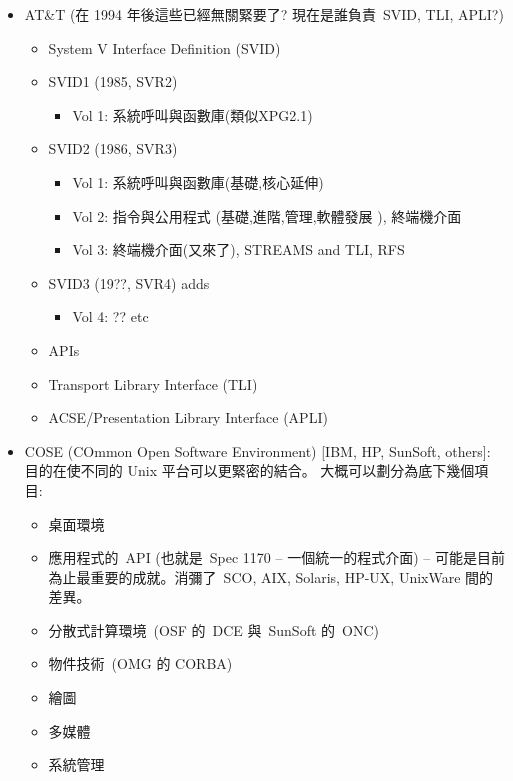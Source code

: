 \documentclass{article}
\begin{document}
\begin{CJK*}{Bg5}{ming}
{\begin{itemize}
      \item AT\&T
        (在 1994 年後這些已經無關緊要了? 現在是誰負責~SVID, TLI, APLI?)
	\begin{itemize}
        \item System V Interface Definition (SVID)
          \item SVID1 (1985, SVR2)
	  \begin{itemize}
            \item Vol 1:  系統呼叫與函數庫(類似XPG2.1)
	  \end{itemize}
          \item SVID2 (1986, SVR3)
	  \begin{itemize}
            \item Vol 1:  系統呼叫與函數庫(基礎,核心延伸)
            \item Vol 2:  指令與公用程式 (基礎,進階,管理,軟體發展
                    ), 終端機介面
            \item Vol 3:  終端機介面(又來了), STREAMS and TLI, RFS
	  \end{itemize}
          \item SVID3 (19??, SVR4) adds
	  \begin{itemize}
            \item Vol 4:  ??  etc
	  \end{itemize}
	\end{itemize}
	\begin{itemize}
        \item APIs
          \item Transport Library Interface (TLI)
          \item ACSE/Presentation Library Interface (APLI)
	\end{itemize}

      \item COSE (COmmon Open Software Environment) [IBM, HP, SunSoft, others]:
        目的在使不同的 Unix 平台可以更緊密的結合。
        大概可以劃分為底下幾個項目:
	\begin{itemize}
          \item 桌面環境
          \item 應用程式的~API (也就是~Spec 1170 -- 一個統一的程式介面) --
          可能是目前為止最重要的成就。消彌了~SCO, AIX, Solaris,
          HP-UX, UnixWare 間的差異。
          \item 分散式計算環境~(OSF 的~DCE 與~SunSoft 的~ONC)
          \item 物件技術~(OMG 的 CORBA)
          \item 繪圖
          \item 多媒體
          \item 系統管理
	\end{itemize}


\end{itemize}}
\end{CJK*}
\end{document}
